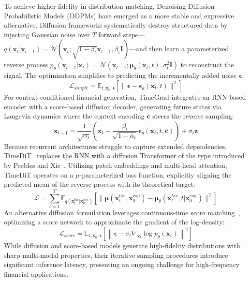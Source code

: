 To achieve higher fidelity in distribution matching, Denoising Diffusion Probabilistic Models (DDPMs) \citep{ho2020ddpm} have emerged as a more stable and expressive alternative. Diffusion frameworks systematically destroy structured data by injecting Gaussian noise over $T$ forward steps—$q(\mathbf{x}_t|\mathbf{x}_{t-1}) = \mathcal{N}(\mathbf{x}_t; \sqrt{1 - \beta_t}\mathbf{x}_{t-1}, \beta_t \mathbf{I})$—and then learn a parameterized reverse process $p_\theta(\mathbf{x}_{t-1}|\mathbf{x}_t) = \mathcal{N}(\mathbf{x}_{t-1}; \boldsymbol{\mu}_\theta(\mathbf{x}_t, t), \sigma_t^2 \mathbf{I})$ to reconstruct the signal. The optimization simplifies to predicting the incrementally added noise $\boldsymbol{\epsilon}$:
\begin{equation}
\mathcal{L}_{simple} = \mathbb{E}_{t, \mathbf{x}_0, \boldsymbol{\epsilon}}[\|\boldsymbol{\epsilon} - \boldsymbol{\epsilon}_\theta(\mathbf{x}_t, t)\|^2]
\end{equation}
For context-conditioned financial generation, TimeGrad \citep{rasul2021timegrad} integrates an RNN-based encoder with a score-based diffusion decoder, generating future states via Langevin dynamics where the context encoding $\mathbf{c}$ steers the reverse sampling:
\begin{equation}
\mathbf{x}_{t-1} = \frac{1}{\sqrt{\alpha_t}} \left( \mathbf{x}_t - \frac{\beta_t}{\sqrt{1 - \bar{\alpha}_t}} \boldsymbol{\epsilon}_\theta(\mathbf{x}_t, t, \mathbf{c}) \right) + \sigma_t \mathbf{z}
\end{equation}
Because recurrent architectures struggle to capture extended dependencies, TimeDiT~\citep{cao2024timedit} replaces the RNN with a diffusion Transformer of the type introduced by Peebles and Xie~\citep{peebles2023scalable}. Utilizing patch embeddings and multi-head attention, TimeDiT operates on a $\mu$-parameterized loss function, explicitly aligning the predicted mean of the reverse process with its theoretical target:
\begin{equation}
\mathcal{L} = \sum_{t=1}^T \mathbb{E}_{q(\mathbf{x}_t^{tar}|\mathbf{x}_0^{con})} \left[ \|\boldsymbol{\mu}(\mathbf{x}_t^{tar}, \mathbf{x}_0^{con}) - \boldsymbol{\mu}_\theta(\mathbf{x}_t^{tar}, t|\mathbf{x}_0^{con})\|^2 \right]
\end{equation}
An alternative diffusion formulation leverages continuous-time score matching~\citep{song2019generative,song2021score}, optimizing a score network to approximate the gradient of the log-density:
\begin{equation}
\mathcal{L}_{score} = \mathbb{E}_{t, \mathbf{x}_0, \boldsymbol{\epsilon}} \left[ \left\| \boldsymbol{\epsilon} - \sigma_t \nabla_{\mathbf{x}_t} \log p_\theta(\mathbf{x}_t) \right\|^2 \right]
\end{equation}
While diffusion and score-based models generate high-fidelity distributions with sharp multi-modal properties, their iterative sampling procedures introduce significant inference latency, presenting an ongoing challenge for high-frequency financial applications.

